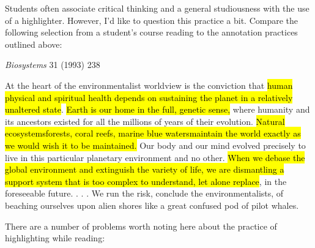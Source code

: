 Students often associate critical thinking and a general studiousness with the use of a highlighter. However, I'd like to question this practice a bit. Compare the following selection from a student's course reading to the annotation practices outlined above:

\bigskip

\begin{tcolorbox}[enhanced,width=4.2in,left=.4in, right=.4in,
   drop fuzzy shadow southeast,
    boxrule=0.4pt,sharp corners,colframe=black!80!black,colback=white!10]

\smallskip

\begin{flushright}


{\economica \emph{Biosystems} 31 (1993) \hspace{6pt} 238}

\end{flushright}

{\small
\begin{doublespacing}

\hspace{.5cm}At the heart of the environmentalist worldview is the conviction that \hl{human physical and spiritual health depends on sustaining the planet in a relatively unaltered state}. \hl{Earth is our home in the full, genetic sense,} where humanity and its ancestors existed for all the millions of years of their evolution. \hl{Natural ecosystems\textemdash forests, coral reefs, marine blue waters\textemdash maintain the world exactly as we would wish it to be maintained.} Our body and our mind evolved precisely to live in this particular planetary environment and no other. \hl{When we debase the global environment and extinguish the variety of life, we are dismantling a support system that is too complex to understand, let alone replace}, in the foreseeable future. . . . We run the risk, conclude the environmentalists, of beaching ourselves upon alien shores like a great confused pod of pilot whales.

\bigskip


\end{doublespacing}}

\end{tcolorbox}

There are a number of problems worth noting here about the practice of highlighting while reading: 

